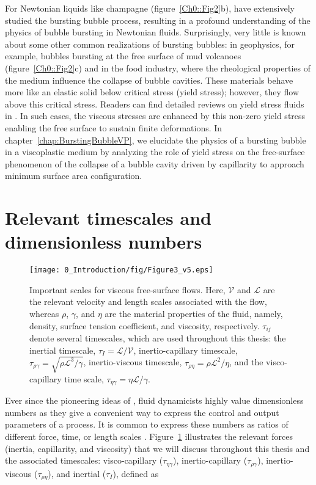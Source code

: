 For Newtonian liquids like champagne (figure~\ref{Ch0::Fig2}b), \citet{duchemin2002jet, ganan2017revision, deike2018dynamics, gordillo2019capillary} have extensively studied the bursting bubble process, resulting in a profound understanding of the physics of bubble bursting in Newtonian fluids. Surprisingly, very little is known about some other common realizations of bursting bubbles: in geophysics, for example, bubbles bursting at the free surface of mud volcanoes (figure~\ref{Ch0::Fig2}c) and in the food industry, where the rheological properties of the medium influence the collapse of bubble cavities. These materials behave more like an elastic solid below critical stress (yield stress); however, they flow above this critical stress. Readers can find detailed reviews on yield stress fluids in \citet{bird1983rheology,coussot2014yield,balmforth2014yielding,bonn2017yield}. In such cases, the viscous stresses are enhanced by this non-zero yield stress enabling the free surface to sustain finite deformations. In chapter~\ref{chap:BurstingBubbleVP}, we elucidate the physics of a bursting bubble in a viscoplastic medium by analyzing the role of yield stress on the free-surface phenomenon of the collapse of a bubble cavity driven by capillarity to approach minimum surface area configuration. 

\section*{Relevant timescales and dimensionless numbers}
\begin{figure}
	\centering
	\texttt{[image: 0\_Introduction/fig/Figure3\_v5.eps]}
	\caption{Important scales for viscous free-surface flows. Here, $\mathcal{V}$ and $\mathcal{L}$ are the relevant velocity and length scales associated with the flow, whereas $\rho$, $\gamma$, and $\eta$ are the material properties of the fluid, namely, density, surface tension coefficient, and viscosity, respectively. $\tau_{ij}$ denote several timescales, which are used throughout this thesis: the inertial timescale, $\tau_I = \mathcal{L}/\mathcal{V}$, inertio-capillary timescale, $\tau_{\rho\gamma} = \sqrt{\rho\mathcal{L}^3/\gamma}$, inertio-viscous timescale, $\tau_{\rho\eta} = \rho\mathcal{L}^2/\eta$, and the visco-capillary time scale, $\tau_{\eta\gamma} = \eta\mathcal{L}/\gamma$.}
	\label{Ch0::Fig3}
\end{figure}

Ever since the pioneering ideas of \citet{buckingham1914physically, buckingham1915principle}, fluid dynamicists highly value dimensionless numbers as they give a convenient way to express the control and output parameters of a process. It is common to express these numbers as ratios of different force, time, or length scales \citep{lohse2022fundamental}. Figure~\ref{Ch0::Fig3} illustrates the relevant forces (inertia, capillarity, and viscosity) that we will discuss throughout this thesis and the associated timescales: visco-capillary ($\tau_{\eta\gamma}$), inertio-capillary ($\tau_{\rho\gamma}$), inertio-viscous  ($\tau_{\rho\eta} $), and inertial ($\tau_I$), defined as

